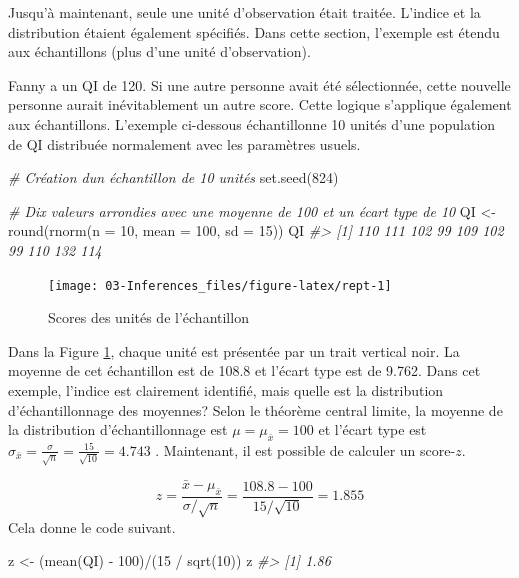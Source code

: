 \documentclass[
]{book}
\newenvironment{Shaded}{}{}
\newcommand{\AttributeTok}[1]{#1}
\newcommand{\CommentTok}[1]{\textit{#1}}
\newcommand{\DecValTok}[1]{#1}
\newcommand{\FunctionTok}[1]{#1}
\newcommand{\NormalTok}[1]{#1}
\newcommand{\OtherTok}[1]{#1}
\newcommand{\SpecialCharTok}[1]{#1}
\begin{document}
Jusqu'à maintenant, seule une unité d'observation était traitée. L'indice et la distribution étaient également spécifiés. Dans cette section, l'exemple est étendu aux échantillons (plus d'une unité d'observation).

Fanny a un QI de 120. Si une autre personne avait été sélectionnée, cette nouvelle personne aurait inévitablement un autre score. Cette logique s'applique également aux échantillons. L'exemple ci-dessous échantillonne 10 unités d'une population de QI distribuée normalement avec les paramètres usuels.

\begin{Shaded}
\begin{Highlighting}[]
\CommentTok{\# Création d\textquotesingle{}un échantillon de 10 unités}
\FunctionTok{set.seed}\NormalTok{(}\DecValTok{824}\NormalTok{)}

\CommentTok{\# Dix valeurs arrondies avec une moyenne de 100 et un écart type de 10}
\NormalTok{QI }\OtherTok{\textless{}{-}} \FunctionTok{round}\NormalTok{(}\FunctionTok{rnorm}\NormalTok{(}\AttributeTok{n =} \DecValTok{10}\NormalTok{, }\AttributeTok{mean =} \DecValTok{100}\NormalTok{, }\AttributeTok{sd =} \DecValTok{15}\NormalTok{))}
\NormalTok{QI}
\CommentTok{\#\textgreater{}  [1] 110 111 102  99 109 102  99 110 132 114}
\end{Highlighting}
\end{Shaded}

\begin{figure}
\texttt{[image: 03-Inferences\_files/figure-latex/rept-1]} \caption{Scores des unités de l'échantillon}\label{fig:rept}
\end{figure}

Dans la Figure \ref{fig:rept}, chaque unité est présentée par un trait vertical noir. La moyenne de cet échantillon est de 108.8 et l'écart type est de 9.762. Dans cet exemple, l'indice est clairement identifié, mais quelle est la distribution d'échantillonnage des moyennes? Selon le théorème central limite, la moyenne de la distribution d'échantillonnage est \(\mu=\mu_{\bar{x}}=100\) et l'écart type est \(\sigma_{\bar{x}} = \frac{\sigma}{\sqrt{n}}=\frac{15}{\sqrt{10}}=4.743\) . Maintenant, il est possible de calculer un score-\(z\).

\[
z = \frac{\bar{x}-\mu_{\bar{x}}}{\sigma/\sqrt{n}}=\frac{108.8-100}{15/\sqrt{10}}=1.855
\]
Cela donne le code suivant.

\begin{Shaded}
\begin{Highlighting}[]
\NormalTok{z }\OtherTok{\textless{}{-}}\NormalTok{ (}\FunctionTok{mean}\NormalTok{(QI) }\SpecialCharTok{{-}} \DecValTok{100}\NormalTok{)}\SpecialCharTok{/}\NormalTok{(}\DecValTok{15} \SpecialCharTok{/} \FunctionTok{sqrt}\NormalTok{(}\DecValTok{10}\NormalTok{))}
\NormalTok{z}
\CommentTok{\#\textgreater{} [1] 1.86}
\end{Highlighting}
\end{Shaded}
\end{document}
